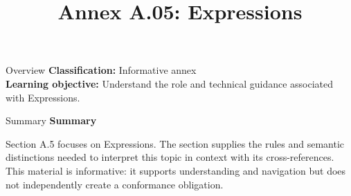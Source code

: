 \documentclass[10pt,letterpaper]{article}
\title{Annex A.05: Expressions}
\author{}
\date{}
\begin{document}
\maketitle
\begin{CornellOverviewBox}{Overview}
\textbf{Classification:} Informative annex\\[2pt]
\textbf{Learning objective:} Understand the role and technical guidance associated with Expressions.
\end{CornellOverviewBox}\begin{CornellSummaryBox}{Summary}
{\sffamily\bfseries\color{Accent} Summary}\par\vspace{3pt}Section A.5 focuses on Expressions. The section supplies the rules and semantic distinctions needed to interpret this topic in context with its cross-references. This material is informative: it supports understanding and navigation but does not independently create a conformance obligation.
\end{CornellSummaryBox}
\end{document}
